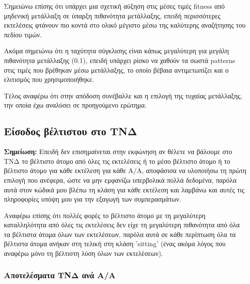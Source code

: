 \documentclass[12pt,a4paper]{article}
\begin{document}
Σημειώνω επίσης ότι υπάρχει μια σχετική αύξηση στις μέσες τιμές fitness από μηδενική μετάλλαξη σε ύπαρξη πιθανότητα μετάλλαξης, επειδή περισσότερες εκτελέσεις φτάνουν πιο κοντά στο ολικό μέγιστο μέσω της καλύτερης αναζήτησης του πεδίου τιμών.

Ακόμα σημειώνω ότι η ταχύτητα σύγκλισης είναι κάπως μεγαλύτερη για μεγάλη πιθανότητα μετάλλαξης (0.1), επειδή υπάρχει ρίσκο να χαθούν τα σωστά patterns στις τιμές που βρέθηκαν μέσω μετάλλαξης, το οποίο βέβαια αντιμετωπίζει και ο ελιτισμός που χρησιμοποιήθηκε.

Τέλος αναφέρω ότι στην απόδοση συνέβαλλε και η επιλογή της τυχαίας μετάλλαξης, την οποία έχω αναλύσει σε προηγούμενο ερώτημα.

\subsection{Είσοδος βέλτιστου στο ΤΝΔ}

\textbf{Σημείωση:} Επειδή δεν επισημαίνεται στην εκφώνηση αν θέλετε να βάλουμε στο ΤΝΔ το βέλτιστο άτομο από όλες τις εκτελέσεις ή το μέσο βέλτιστο άτομο ή το βέλτιστο άτομο για κάθε εκτέλεση για κάθε Α/Α, αποφάσισα να υλοποιήσω τη πρώτη επιλογή που ανέφερα, ώστε να μην εμφανίζω υπερβολικά πολλά δεδομένα, παρόλα αυτά στον κώδικά μου βλέπω τη κλάση για κάθε εκτέλεση και λαμβάνω και αυτές τις πληροφορίες υπόψη μου για την εξαγωγή των συμπερασμάτων.

Αναφέρω επίσης ότι πολλές φορές το βέλτιστο άτομο με τη μεγαλύτερη καταλληλότητα από όλες τις εκτελέσεις δεν είχε τη μεγαλύτερη πιθανότητα από όλα τα βέλτιστα άτομα όλων των εκτελέσεων, παρόλα αυτά σε κάθε περίπτωση όλα τα βέλτιστα άτομα ανήκαν στη τελική στη κλάση 'sitting' (ένας ακόμα λόγος που αναφέρω μόνο τη βέλτιστη λύση όλων των εκτελέσεων).

\subsubsection{Αποτελέσματα ΤΝΔ ανά Α/Α}
\end{document}
